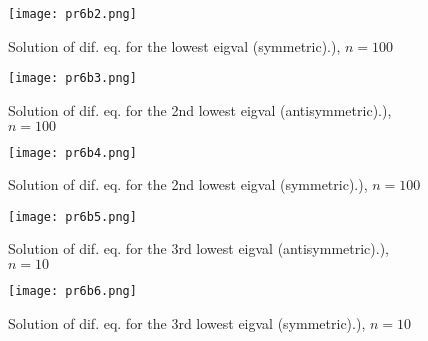 \documentclass{article}
\begin{document}
\begin{figure}
  \caption{Solution of dif. eq. for the lowest eigval (symmetric).), $n=100$}
  \centering
    \texttt{[image: pr6b2.png]}
\end{figure}
\begin{figure}
  \caption{Solution of dif. eq. for the 2nd lowest eigval (antisymmetric).), $n=100$}
  \centering
    \texttt{[image: pr6b3.png]}
\end{figure}
\begin{figure}
  \caption{Solution of dif. eq. for the 2nd lowest eigval (symmetric).), $n=100$}
  \centering
    \texttt{[image: pr6b4.png]}
\end{figure}
\begin{figure}
  \caption{Solution of dif. eq. for the 3rd lowest eigval (antisymmetric).), $n=10$}
  \centering
    \texttt{[image: pr6b5.png]}
\end{figure}
\begin{figure}
  \caption{Solution of dif. eq. for the 3rd lowest eigval (symmetric).), $n=10$}
  \centering
    \texttt{[image: pr6b6.png]}
\end{figure}
\end{document}
